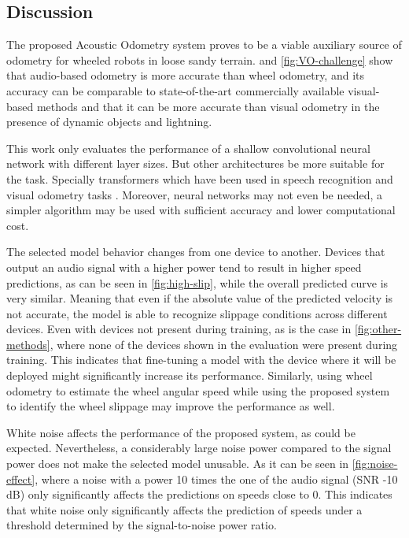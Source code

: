 \subsection{Discussion} \label{subsec:discussion}

The proposed Acoustic Odometry system proves to be a viable auxiliary source of
odometry for wheeled robots in loose sandy terrain. 
and \cref{fig:VO-challenge} show that audio-based odometry is more accurate
than wheel odometry, and its accuracy can be comparable to state-of-the-art
commercially available visual-based methods and that it can be more accurate
than visual odometry in the presence of dynamic objects and lightning. 

This work only evaluates the performance of a shallow convolutional neural
network with different layer sizes. But other architectures be more suitable
for the task. Specially transformers \cite{vaswani2017attention} which have
been used in speech recognition \cite{kim2022squeezeformer} and visual odometry
tasks \cite{li2020transformer}. Moreover, neural networks may not even be
needed, a simpler algorithm may be used with sufficient accuracy and lower
computational cost.

The selected model behavior changes from one device to another. Devices that
output an audio signal with a higher power tend to result in higher speed
predictions, as can be seen in \cref{fig:high-slip}, while the overall
predicted curve is very similar. Meaning that even if the absolute value of the
predicted velocity is not accurate, the model is able to recognize slippage
conditions across different devices. Even with devices not present during
training, as is the case in \cref{fig:other-methods}, where none of the devices
shown in the evaluation were present during training. This indicates that
fine-tuning \cite{TL2016} a model with the device where it will be deployed
might significantly increase its performance. Similarly, using wheel odometry
to estimate the wheel angular speed while using the proposed system to identify
the wheel slippage may improve the performance as well.

White noise affects the performance of the proposed system, as could
be expected. Nevertheless, a considerably large noise power compared to the
signal power does not make the selected model unusable. As it can be seen in
\cref{fig:noise-effect}, where a noise with a power 10 times the one of the
audio signal (SNR -10 dB) only significantly affects the predictions on
speeds close to 0. This indicates that white noise only significantly affects
the prediction of speeds under a threshold determined by the signal-to-noise
power ratio.

